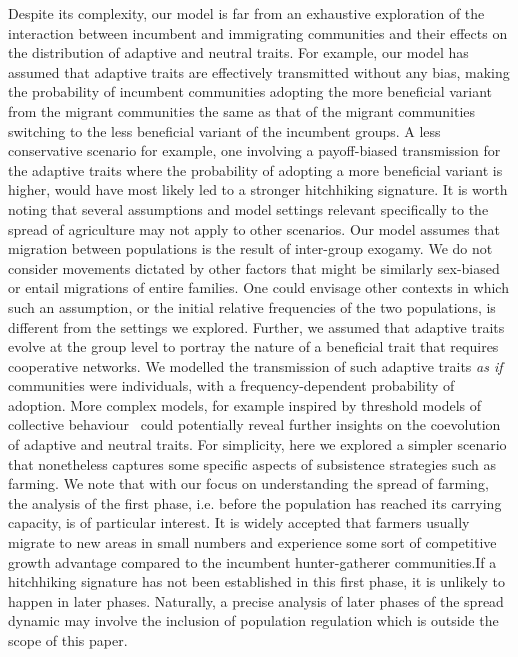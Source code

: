 \documentclass[9pt,twocolumn,twoside,lineno]{pnas-new}
\begin{document}
Despite its complexity, our model is far from an exhaustive exploration of the interaction between incumbent and immigrating communities and their effects on the distribution of adaptive and neutral traits. 
For example, our model has assumed that adaptive traits are effectively transmitted without any bias, making the probability of incumbent communities adopting the more beneficial variant from the migrant communities the same as that of the migrant communities switching to the less beneficial variant of the incumbent groups. 
A less conservative scenario for example, one involving a payoff-biased transmission for the adaptive traits where the probability of adopting a more beneficial variant is higher, would have most likely led to a stronger hitchhiking signature. 
{\color{red} It is worth noting that several assumptions and model settings relevant specifically to the spread of agriculture may not apply to other scenarios. 
Our model assumes that migration between populations is the result of inter-group exogamy. We do not consider movements dictated by other factors that might be similarly sex-biased or entail migrations of entire families.
One could envisage other contexts in which such an assumption, or the initial relative frequencies of the two populations, is different from the settings we explored.
Further, we assumed that adaptive traits evolve at the group level to portray the nature of a beneficial trait that requires cooperative networks. 
We modelled the transmission of such adaptive traits \textit{as if} communities were individuals, with a frequency-dependent probability of adoption. More complex models, for example inspired by threshold models of collective behaviour~\cite{granovetter_threshold_1978} could potentially reveal further insights on the coevolution of adaptive and neutral traits. For simplicity, here we explored a simpler scenario that nonetheless captures some specific aspects of subsistence strategies such as farming. 
We note that with our focus on understanding the spread of farming, the analysis of the first phase, i.e. before the population has reached its carrying capacity, is of particular interest. It is widely accepted that farmers usually migrate to new areas in small numbers and experience some sort of competitive growth advantage compared to the incumbent hunter-gatherer communities.If a hitchhiking signature has not been established in this first phase, it is  unlikely to happen in later phases. Naturally, a precise analysis of later phases of the spread dynamic may involve the inclusion of population regulation which is outside the scope of this paper. }
\end{document}
